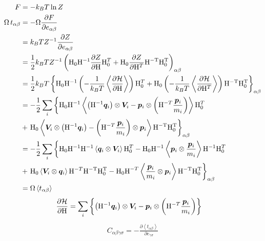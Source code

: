 \documentclass[11pt,a4paper,uplatex]{jsarticle}
\begin{document}
\begin{align}
    F &= - k_{B} T  \ln Z \\
    \Omega \, t_{\alpha \beta} &= - \Omega \frac{\partial F}{\partial e_{\alpha \beta}} \\
    &= k_{B} T Z^{-1} \frac{\partial Z}{\partial e_{\alpha \beta}} \\
    &= \frac{1}{2} k_{B} T Z^{-1} \left({\rm H_{0}H^{-1}}\frac{\partial Z}{\partial {\rm H}}{\rm H}_{0}^{T} + {\rm H_{0}}\frac{\partial Z}{\partial {\rm H}^T}{\rm H^{-T}}{\rm H_{0}^{T}}\right)_{\alpha \beta} \\ 
    &= \frac{1}{2} k_{B} T \left\{ {\rm H_{0}H^{-1}}\left(-\frac{1}{k_{B}T} \left< \frac{\partial {\cal H}}{\partial {\rm H}}\right> \right){\rm H}_{0}^{T}  
    + {\rm H_{0}} \left(-\frac{1}{k_{B}T} \left< \frac{\partial {\cal H}}{\partial {\rm H}^{T}}\right> \right){\rm H^{-T}}{\rm H_{0}^{T}}\right\}_{\alpha \beta} \\  
    &= -\frac{1}{2} \sum_{i} \left\{ {\rm H_{0}H^{-1}}\left< \left({\rm H}^{-1} \bm{q}_{i}\right) \otimes \bm{V}_{i} - \bm{p}_{i} \otimes \left( {\rm H}^{-T}\frac{\bm{p}_{i}}{m_{i}}  \right)  \right> {\rm H}_{0}^{T} \right.\\
    &+ \left. {\rm H_{0}} \left< \bm{V}_{i} \otimes \left({\rm H}^{-1} \bm{q}_{i}\right)
    -  \left( {\rm H}^{-T}\frac{\bm{p}_{i}}{m_{i}}  \right) \otimes \bm{p}_{i} \right> {\rm H^{-T}}{\rm H_{0}^{T}}\right\}_{\alpha \beta} \\ 
    &= -\frac{1}{2} \sum_{i} \left\{ {\rm H_{0}H^{-1}}{\rm H}^{-1} \left< \bm{q}_{i} \otimes \bm{V}_{i} \right> {\rm H}_{0}^{T} - {\rm H_{0} H^{-1}} \left<\bm{p}_{i} \otimes \frac{\bm{p}_{i}}{m_{i}}   \right> {\rm H}^{-1} {\rm H}_{0}^{T} \right.\\
    &+ \left. {\rm H_{0}} \left< \bm{V}_{i} \otimes  \bm{q}_{i} \right> {\rm H}^{-T} {\rm H^{-T} H_{0}^{T}} 
    -   {\rm H_{0} H}^{-T} \left< \frac{\bm{p}_{i}}{m_{i}} \otimes \bm{p}_{i} \right> {\rm H^{-T}}{\rm H_{0}^{T}}\right\}_{\alpha \beta} \\
    &= \Omega \left< t_{\alpha \beta} \right>
\end{align}
\begin{align}
\frac{\partial {\cal H}}{\partial {\rm H}} &= \sum_{i} \left\{ \left({\rm H}^{-1} \bm{q}_{i}\right) \otimes \bm{V}_{i} 
- \bm{p}_{i} \otimes \left( {\rm H}^{-T}\frac{\bm{p}_{i}}{m_{i}}  \right) \right\}     
\end{align}
\begin{align}
    C_{\alpha \beta \gamma \sigma} = -\frac{\partial \left< t_{\alpha \beta} \right>}{\partial e_{\gamma \sigma}}
\end{align}

%
\end{document}
